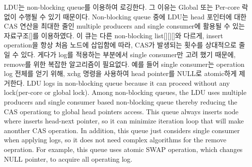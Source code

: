 \ifkor
LDU는  non-blocking queue를 이용하여 로깅한다. 그 이유는 Global 또는 Per-core 락 없이 수행될 수 
있기 때문이다. 
Non-blocking queue 중에 LDU는 head 포인터에 대한 CAS 연산을 최대한 줄인 multiple producers and
single consumer에 활용될 수 있는 자료구조[]를 이용하였다.
이 큐는 다른 non-blocking list[][][]와 다르게, insert operation을 항상 처음 노드에 삽입함에
따라, CAS가 발생되는 횟수를 상대적으로 줄일 수 있다.
게다가 log를 적용하는 부분에서 single consumer만 고려 했기 때문에, remove를 위한 복잡한 알고리즘이 필요없다. 
예를 들어 single consumer는 operation log 전체를 얻기 위해, xchg 명령을 사용하여 head pointer를
NULL로 atomic하게 제거한다. 
\else
LDU logs in non-blocking queue because it can proceed without any lock(per-core
or global lock).
Among non-blocking queues, the LDU uses multiple producers and single consumer
based non-blocking queue thereby reducing the CAS operationg to global head
pointers access.
This queue always inserts node where inserts head-next pointer, so it can
minimize iteration loop that will make anonther CAS operation.
In addition, this queue just considers single consumer when applying logs, so it
does not need complex algorithms for the remove oepration.
For example, this queue uses atomic SWAP operation, which changes NULL pointer,
to acquire all operating log.
\fi


